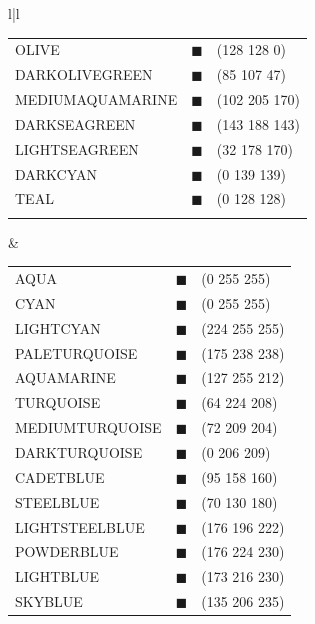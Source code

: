 \begin{table}[t]
{\begin{center}
\begin{tabular}{l|l}
\begin{tabular}{lll}
OLIVE					& {\color[RGB]{128,128,0}$\blacksquare$}	& (128 128 0)	\\
DARKOLIVEGREEN			& {\color[RGB]{85,107,47}$\blacksquare$}	& (85 107 47)	\\
MEDIUMAQUAMARINE		& {\color[RGB]{102,205,170}$\blacksquare$}	& (102 205 170)	\\
DARKSEAGREEN			& {\color[RGB]{143,188,143}$\blacksquare$}	& (143 188 143)	\\
LIGHTSEAGREEN			& {\color[RGB]{32,178,170}$\blacksquare$}	& (32 178 170)	\\
DARKCYAN				& {\color[RGB]{0,139,139}$\blacksquare$}	& (0 139 139)	\\
TEAL					& {\color[RGB]{0,128,128}$\blacksquare$}	& (0 128 128)	\\
\\
\end{tabular}
\ifLwarp\vspace{2\baselineskip}\else
&
\fi
\begin{tabular}{lll}
AQUA				& {\color[RGB]{0,255,255}$\blacksquare$}	& (0 255 255)	\\
CYAN				& {\color[RGB]{0,255,255}$\blacksquare$}	& (0 255 255)	\\
LIGHTCYAN			& {\color[RGB]{224,255,255}$\blacksquare$}	& (224 255 255)	\\
PALETURQUOISE		& {\color[RGB]{175,238,238}$\blacksquare$}	& (175 238 238)	\\
AQUAMARINE			& {\color[RGB]{127,255,212}$\blacksquare$}	& (127 255 212)	\\
TURQUOISE			& {\color[RGB]{64,224,208}$\blacksquare$}	& (64 224 208)	\\
MEDIUMTURQUOISE		& {\color[RGB]{72,209,204}$\blacksquare$}	& (72 209 204)	\\
DARKTURQUOISE		& {\color[RGB]{0,206,209}$\blacksquare$}	& (0 206 209)	\\
CADETBLUE			& {\color[RGB]{95,158,160}$\blacksquare$}	& (95 158 160)	\\
STEELBLUE			& {\color[RGB]{70,130,180}$\blacksquare$}	& (70 130 180)	\\
LIGHTSTEELBLUE		& {\color[RGB]{176,196,222}$\blacksquare$}	& (176 196 222)	\\
POWDERBLUE			& {\color[RGB]{176,224,230}$\blacksquare$}	& (176 224 230)	\\
LIGHTBLUE			& {\color[RGB]{173,216,230}$\blacksquare$}	& (173 216 230)	\\
SKYBLUE				& {\color[RGB]{135,206,235}$\blacksquare$}	& (135 206 235)	\\

\end{tabular}
\end{tabular}
\end{center}}
\end{table}
